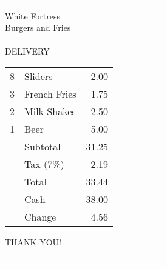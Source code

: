 \documentclass[parskip=half]{scrarticle}
\begin{document}
\huge
\phantom{a}

\vfill


\begin{center}
--------------------------------------------------------\\[-1ex]
White Fortress\\[-0.75ex]
Burgers and Fries\\[-1ex]
--------------------------------------------------------\\[-1ex]
DELIVERY
\vspace{-0.25ex}

\large
\begin{tabular}{llr}
8 & Sliders & 2.00\\[-0.75ex]
3 & French Fries & 1.75\\[-0.75ex]
2 & Milk Shakes & 2.50\\[-0.75ex]
1 & Beer & 5.00\\[1ex]
& Subtotal & 31.25 \\[-0.75ex]
& Tax  (7\%) & 2.19 \\[1ex]
& Total & 33.44 \\[-0.75ex]
& Cash & 38.00 \\[-0.75ex]
& Change & 4.56
\end{tabular}

\huge
THANK YOU!

\vspace{-1.75ex}

--------------------------------------------------------
\end{center}

\vfill

\phantom{a}
\end{document}
